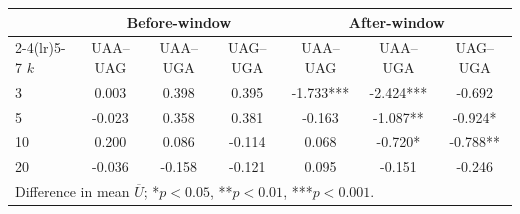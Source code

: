 \begin{center}\small
\begin{tabular}{lcccccc}\toprule
 & \multicolumn{3}{c}{Before-window} & \multicolumn{3}{c}{After-window} \\
\cmidrule(lr){2-4}\cmidrule(lr){5-7}
$k$ & UAA--UAG & UAA--UGA & UAG--UGA & UAA--UAG & UAA--UGA & UAG--UGA \\\midrule
3 & 0.003 & 0.398 & 0.395 & -1.733*** & -2.424*** & -0.692 \\
5 & -0.023 & 0.358 & 0.381 & -0.163 & -1.087** & -0.924* \\
10 & 0.200 & 0.086 & -0.114 & 0.068 & -0.720* & -0.788** \\
20 & -0.036 & -0.158 & -0.121 & 0.095 & -0.151 & -0.246 \\
\bottomrule
\multicolumn{7}{l}{\footnotesize Difference in mean $\overline{U}$; *$p<0.05$, **$p<0.01$, ***$p<0.001$.} \\
\end{tabular}
\end{center}
